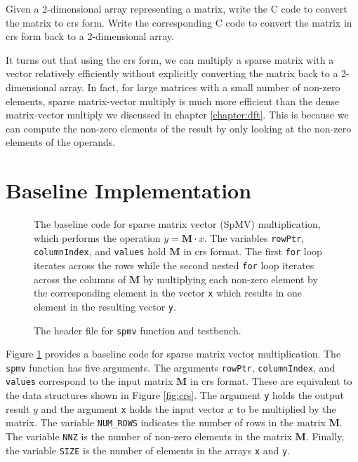 \begin{exercise}
Given a 2-dimensional array representing a matrix, write the C code to convert the matrix to \gls{crs} form.  Write the corresponding C code to convert the matrix in \gls{crs} form back to a 2-dimensional array.
\end{exercise}

It turns out that using the \gls{crs} form, we can multiply a sparse matrix with a vector relatively efficiently without explicitly converting the matrix back to a 2-dimensional array.  In fact, for large matrices with a small number of non-zero elements, sparse matrix-vector multiply is much more efficient than the dense matrix-vector multiply we discussed in chapter \ref{chapter:dft}.  This is because we can compute the non-zero elements of the result by only looking at the non-zero elements of the operands. 

\section{Baseline Implementation}

\begin{figure}

\caption{  The baseline code for sparse matrix vector (SpMV) multiplication, which performs the operation $y = \mathbf{M} \cdot x$. The variables \lstinline{rowPtr}, \lstinline{columnIndex}, and \lstinline{values}  hold $\mathbf{M}$ in \gls{crs} format. The first \lstinline{for} loop iterates across the rows while the second nested \lstinline{for} loop iterates across the columns of $\mathbf{M}$ by multiplying each non-zero element by the corresponding element in the vector \lstinline{x} which results in one element in the resulting vector \lstinline{y}. }
\label{fig:spmv_arch1}
\end{figure}

\begin{figure}

\caption{ The header file for \lstinline{spmv} function and testbench.  }
\label{fig:spmv.h}
\end{figure}

Figure \ref{fig:spmv_arch1} provides a baseline code for sparse matrix vector multiplication. The \lstinline{spmv} function has five arguments. The arguments \lstinline{rowPtr}, \lstinline{columnIndex}, and \lstinline{values} correspond to the input matrix $\mathbf{M}$ in \gls{crs} format. These are equivalent to the data structures shown in Figure \ref{fig:crs}. The argument \lstinline{y} holds the output result $y$ and the argument \lstinline{x} holds the input vector $x$ to be multiplied by the matrix.  The variable \lstinline{NUM_ROWS} indicates the number of rows in the matrix $\mathbf{M}$. The variable \lstinline{NNZ} is the number of non-zero elements in the matrix $\mathbf{M}$. Finally, the variable \lstinline{SIZE} is the number of elements in the arrays \lstinline{x} and \lstinline{y}.

